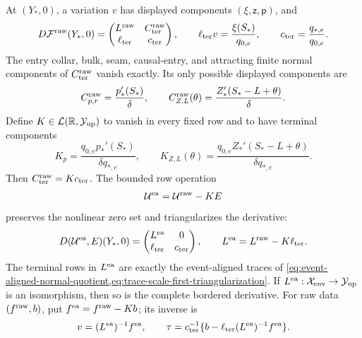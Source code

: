 \begin{lemma}
At \((Y_*,0)\), a variation \(v\) has displayed components
\((\xi,\mathsf z,\mathsf p)\), and
\begin{equation}
 D\mathcal F^{\rm raw}(Y_*,0)
 =\begin{pmatrix}L^{\rm raw}&C_{\rm ter}^{\rm raw}\\
                  \ell_{\rm ter}&c_{\rm ter}\end{pmatrix},
 \qquad
 \ell_{\rm ter}v=\frac{\xi(S_*)}{q_{0,e}},\qquad
 c_{\rm ter}=\frac{q_{*,e}}{q_{0,e}}.           \label{eq:endpoint-selector-raw-border}
\end{equation}
The entry collar, bulk, seam, causal-entry, and attracting finite normal
components of \(C_{\rm ter}^{\rm raw}\) vanish exactly.  Its only possible
displayed components are
\begin{equation}
 C_{p,r}^{\rm raw}=\frac{p_*'(S_*)}{\delta},\qquad
 C_{Z,L}^{\rm raw}(\theta)
 =\frac{Z_*'(S_*-L+\theta)}{\delta}.             \label{eq:endpoint-selector-raw-terminal-column}
\end{equation}
Define \(K\in\mathcal L(\mathbb R,\mathcal Y_{\rm up})\) to vanish in
every fixed row and to have
terminal components
\begin{equation}
 K_p=\frac{q_{0,e}p_*'(S_*)}{\delta q_{*,e}},\qquad
 K_{Z,L}(\theta)
 =\frac{q_{0,e}Z_*'(S_*-L+\theta)}
        {\delta q_{*,e}}.                       \label{eq:endpoint-selector-event-shear}
\end{equation}
Then \(C_{\rm ter}^{\rm raw}=Kc_{\rm ter}\).  The bounded row operation
\begin{equation}
 \mathcal U^{\rm ea}=\mathcal U^{\rm raw}-KE     \label{eq:endpoint-selector-nonlinear-row-shear}
\end{equation}
preserves the nonlinear zero set and triangularizes the derivative:
\begin{equation}
 D(\mathcal U^{\rm ea},E)(Y_*,0)
 =\begin{pmatrix}L^{\rm ea}&0\\
                  \ell_{\rm ter}&c_{\rm ter}\end{pmatrix},
 \qquad
 L^{\rm ea}=L^{\rm raw}-K\ell_{\rm ter}.       \label{eq:endpoint-selector-event-aligned-border}
\end{equation}
The terminal rows in \(L^{\rm ea}\) are exactly the event-aligned traces
of
\cref{eq:event-aligned-normal-quotient,eq:trace-scale-first-triangularization}.
If \(L^{\rm ea}:\mathcal X_{\rm env}\to\mathcal Y_{\rm up}\) is an
isomorphism, then so is the complete bordered derivative.  For raw data
\((f^{\rm raw},b)\), put \(f^{\rm ea}=f^{\rm raw}-Kb\); its inverse is
\begin{equation}
 v=(L^{\rm ea})^{-1}f^{\rm ea},\qquad
 \tau=c_{\rm ter}^{-1}
       \{b-\ell_{\rm ter}(L^{\rm ea})^{-1}f^{\rm ea}\}.
                                                        \label{eq:endpoint-selector-triangular-inverse}
\end{equation}


\end{lemma}
